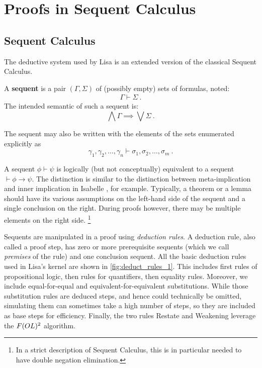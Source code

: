 \section{Proofs in Sequent Calculus}
\label{sec:proofs_lk}
\subsection{Sequent Calculus}
\label{subsec:lk}
The deductive system used by Lisa is an extended version of the classical Sequent Calculus. 
%
\begin{definition}
  A \textbf{sequent} is a pair $(\Gamma, \Sigma)$ of (possibly empty) sets of formulas, noted:
  \begin{gather*}
    \Gamma \vdash \Sigma~.
  \end{gather*}
  The intended semantic of such a sequent is:
  \begin{equation*}
    \label{eq:SequentSemantic}
    \bigwedge \Gamma \implies \bigvee \Sigma~.
  \end{equation*}

  The sequent may also be written with the elements of the sets enumerated explicitly as
  \begin{equation*}
    \gamma_1, \gamma_2, \ldots, \gamma_n \vdash \sigma_1, \sigma_2, \ldots, \sigma_m~.
  \end{equation*}
\end{definition}
A sequent $\phi \vdash \psi$ is logically (but not conceptually) equivalent to a sequent $\vdash \phi \rightarrow \psi$. The distinction is similar to the distinction between meta-implication and inner implication in Isabelle \cite{paulsonIsabelleNext7001993}, for example. Typically, a theorem or a lemma should have its various assumptions on the left-hand side of the sequent and a single conclusion on the right. During proofs however, there may be multiple elements on the right side. \footnote{In a strict description of Sequent Calculus, this is in particular needed to have double negation elimination.}

Sequents are manipulated in a proof using \emph{deduction rules}. A deduction rule, also called a proof step, has zero or more prerequisite sequents (which we call \emph{premises} of the rule) and one conclusion sequent. All the basic deduction rules used in Lisa's kernel are shown in \autoref{fig:deduct_rules_1}.
This includes first rules of propositional logic, then rules for quantifiers, then equality rules. Moreover, we include equal-for-equal and equivalent-for-equivalent substitutions. While those substitution rules are deduced steps, and hence could technically be omitted, simulating them can sometimes take a high number of steps, so they are included as base steps for efficiency.
Finally, the two rules Restate and Weakening leverage the $F(OL)\textsuperscript{2}$ algorithm.

